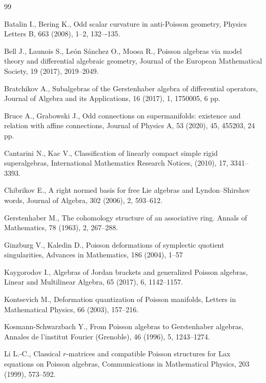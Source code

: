 \documentclass[secthm,seceqn,amsthm,ussrhead,reqno,12pt]{amsart}
\theoremstyle{plain}
\begin{document}
\begin{thebibliography}{99}




  

Batalin I., Bering K., 
Odd scalar curvature in anti-Poisson geometry, 
Physics Letters B, 663 (2008), 1--2, 132–-135.
 
 
 Bell J., Launois S., León  Sánchez O.,  Moosa R., 
 Poisson algebras via model theory and
differential algebraic geometry,  
Journal of the European Mathematical Society,  19 (2017), 2019--2049.
 

Bratchikov A.,  
Subalgebras of the Gerstenhaber algebra of differential operators, 
Journal of Algebra and its Applications, 16 (2017),  1, 1750005, 6 pp.


 
 	 Bruce A., Grabowski J., 
 	 Odd connections on supermanifolds: existence and relation with affine connections, 
 	 Journal of Physics A, 53 (2020),  45, 455203, 24 pp. 
 	 
Cantarini N., Kac V., 
Classification of linearly compact simple rigid superalgebras, 
International Mathematics Research Notices, (2010),  17, 3341--3393. 

 Chibrikov E.,  
 A right normed basis for free Lie algebras and Lyndon--Shirshov words, 
Journal of Algebra, 302 (2006),  2, 593--612. 

Gerstenhaber M., 
The cohomology structure of an associative ring.
Annals of Mathematics,  78 (1963), 2, 267--288.

 Ginzburg V.,   Kaledin D., 
 Poisson deformations of symplectic quotient singularities, 
 Advances in Mathematics, 186 (2004), 1--57

Kaygorodov I.,  
Algebras of Jordan brackets and generalized Poisson algebras,  
Linear and Multilinear Algebra, 65 (2017), 6, 1142--1157.



Kontsevich M., 
Deformation quantization of Poisson manifolds, 
Letters in Mathematical Physics, 66 (2003), 157--216.



Kosmann-Schwarzbach Y., 
From Poisson algebras to Gerstenhaber algebras,
Annales de l'institut Fourier (Grenoble), 46 (1996),  5, 1243--1274.


 Li L.-C., 
 Classical $r$-matrices and compatible Poisson structures for Lax equations on Poisson algebras,
Communications in Mathematical Physics, 203 (1999), 573--592.


\end{thebibliography}
\end{document}
